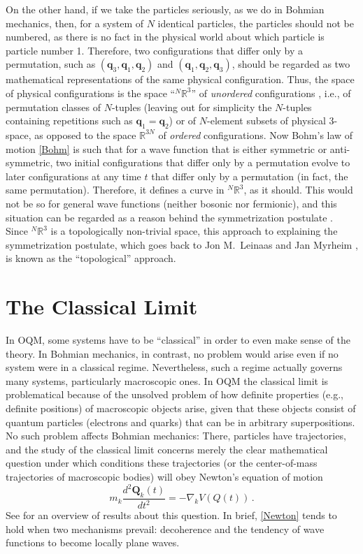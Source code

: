 \documentclass[12pt]{article}
\newcommand{\be}{\begin{equation}}
\newcommand{\ee}{\end{equation}}
\newcommand{\RRR}{\mathbb{R}}
\newcommand{\vQ}{\boldsymbol{Q}}
\newcommand{\vq}{\boldsymbol{q}}
\begin{document}
On the other hand, if we take the particles seriously, as we do in Bohmian mechanics, then, for a system of $N$ identical particles, the particles should not be numbered, as there is no fact in the physical world about which particle is particle number 1. Therefore, two configurations that differ only by a permutation, such as $(\vq_3,\vq_1,\vq_2)$ and $(\vq_1,\vq_2,\vq_3)$, should be regarded as two mathematical representations of the same physical configuration. Thus, the space of physical configurations is the space ``${}^N\RRR^3$'' of \emph{unordered} configurations \cite{LM77}, i.e., of permutation classes of $N$-tuples (leaving out for simplicity the $N$-tuples containing repetitions such as $\vq_1=\vq_2$) or of $N$-element subsets of physical 3-space, as opposed to the space $\RRR^{3N}$ of \emph{ordered} configurations. Now Bohm's law of motion \eqref{Bohm} is such that for a wave function that is either symmetric or anti-symmetric, two initial configurations that differ only by a permutation evolve to later configurations at any time $t$ that differ only by a permutation (in fact, the same permutation). Therefore, it defines a curve in ${}^N\RRR^3$, as it should. This would not be so for general wave functions (neither bosonic nor fermionic), and this situation can be regarded as a reason behind the symmetrization postulate \cite{Bac03,topid0}. Since ${}^N\RRR^3$ is a topologically non-trivial space, this approach to explaining the symmetrization postulate, which goes back to Jon M.~Leinaas and Jan Myrheim \cite{LM77}, is known as the ``topological'' approach.



\section{The Classical Limit}

In OQM, some systems have to be ``classical'' in order to even make sense of the theory. In Bohmian mechanics, in contrast, no problem would arise even if no system were in a classical regime. Nevertheless, such a regime actually governs many systems, particularly macroscopic ones.  In OQM the classical limit is problematical because of the unsolved problem of how definite properties (e.g., definite positions) of macroscopic objects arise, given that these objects consist of quantum particles (electrons and quarks) that can be in arbitrary superpositions.
No such problem affects Bohmian mechanics: There, particles have trajectories, and the study of the classical limit concerns merely the clear mathematical question under which conditions these trajectories (or the center-of-mass trajectories of macroscopic bodies) will obey Newton's equation of motion
\be\label{Newton}
m_k\frac{d^2\vQ_k(t)}{dt^2}=-\nabla_k V(Q(t))\,.
\ee
See \cite{cl} for an overview of results about this question. In brief, \eqref{Newton} tends to hold when two mechanisms prevail: decoherence \cite{Cru} and the tendency of wave functions to become locally plane waves.
\end{document}
